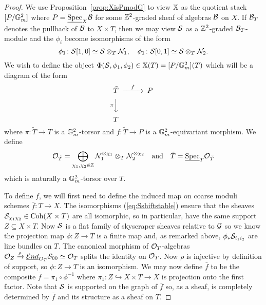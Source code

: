 \documentclass[12pt]{amsart}
\begin{document}
\begin{proof}
We use Proposition~\ref{prop:XisPmodG} to view $\mathbb{X}$ as the quotient stack $[P/\mathbb{G}_m^2]$ where $P = \underline{\operatorname{Spec}}_X \mathcal{B}$ for some $\mathbb{Z}^2$-graded sheaf of algebras $\mathcal{B}$ on $X$. 
If $\mathcal{B}_T$ denotes the pullback of $\mathcal{B}$ to $X \times T$, then we may view $\mathcal{S}$ as a $\mathbb{Z}^2$-graded $\mathcal{B}_T$-module and the $\phi_i$ become isomorphisms of the form 
\begin{equation}
\phi_1 \colon \mathcal{S}[1,0] \simeq \mathcal{S} \otimes_T \mathcal{N}_1, \quad 
\phi_1 \colon \mathcal{S}[0,1] \simeq \mathcal{S} \otimes_T \mathcal{N}_2.
\label{eq:Sshiftstable}
\end{equation}
We wish to define the object $\Phi(\mathcal{S}, \phi_1,\phi_2) \in \mathbb{X}(T) = [P/\mathbb{G}_m^2](T)$ which will be a diagram of the form
$$
\begin{CD}
\tilde{T} @>{f}>>  P \\
@V{\pi}VV @. \\
T @. 
\end{CD}
$$
where $\pi\colon \tilde{T} \to T$ is a $\mathbb{G}_m^2$-torsor and $f\colon \tilde{T} \to P$ is a $\mathbb{G}_m^2$-equivariant morphism. 
We define 
$$ \mathcal{O}_{\tilde{T}} = \bigoplus_{\chi_1,\chi_2 \in \mathbb{Z}} \mathcal{N}_1^{\otimes \chi_1} \otimes_T \mathcal{N}_2^{\otimes \chi_2} \quad \text{and} \quad  \tilde{T} = \underline{\operatorname{Spec}}_T \mathcal{O}_{\tilde{T}}$$
which is naturally a $\mathbb{G}_m^2$-torsor over $T$. 

To define $f$, we will first need to define the induced map on coarse moduli schemes $\bar{f} \colon T \to X$. The isomorphisms (\ref{eq:Sshiftstable}) ensure that the sheaves $\mathcal{S}_{\chi_1\chi_2} \in \operatorname{Coh}(X \times T)$ are all isomorphic, so in particular, have the same support $Z \subseteq X \times T$. Now $\mathcal{S}$ is a flat family of skyscraper sheaves relative to $\mathcal{G}$ so we know the projection map $\phi \colon Z \to T$ is a finite map and, as remarked above, $\phi_* \mathcal{S}_{i_1i_2}$ are line bundles on $T$. The canonical morphism of $\mathcal{O}_T$-algebras $\mathcal{O}_Z \xrightarrow{\rho} \underline{\mathop{{\mathcal{E}}nd}\nolimits}_{\mathcal{O}_T} \mathcal{S}_{00} \simeq \mathcal{O}_T$ splits the identity on $\mathcal{O}_T$. Now $\rho$ is injective by definition of support, so $\phi \colon Z \to T$ is an isomorphism. We may now define $\bar{f}$ to be the composite $\bar{f} = \pi_1 \circ \phi^{-1}$ where $\pi_1 \colon Z \hookrightarrow X \times T \to X$ is projection onto the first factor. Note that $\mathcal{S}$ is supported on the graph of $\bar{f}$ so, as a sheaf, is completely determined by $\bar{f}$ and its structure as a sheaf on $T$. 


\end{proof}
\end{document}
